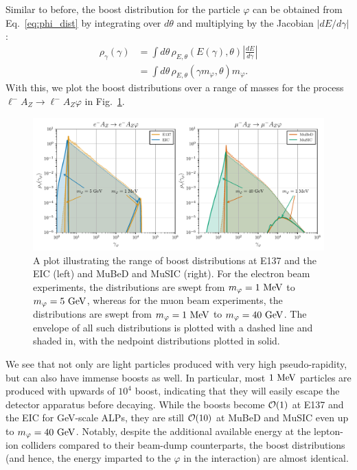 Similar to before, the boost distribution for the particle $\varphi$ can be obtained from Eq.~\ref{eq:phi_dist} by integrating over $d\theta$ and multiplying by the Jacobian $|dE/d\gamma|$:
\begin{align}
    \rho_\gamma(\gamma) &= \int{d\theta\, \rho_{E,\theta}(E(\gamma), \theta)\left|\frac{dE}{d\gamma}\right|} \nonumber\\
    &= \int{d\theta\,\rho_{E,\theta}(\gamma m_\varphi, \theta)}m_\varphi.
\end{align}
With this, we plot the boost distributions over a range of masses for the process $\ell^- A_Z \rightarrow \ell^- A_Z \varphi$ in Fig.~\ref{fig:boost_distributions_diagonal}.

\begin{figure}[t!]
    \centering
    \includegraphics[width=\linewidth]{figures/chapter4/gamma_distributions_diagonal.pdf}
    \caption[Boost distributions of scalars produced at various lepton-nucleus collision experiments.]{A plot illustrating the range of boost distributions at E137 and the EIC (left) and MuBeD and MuSIC (right). For the electron beam experiments, the distributions are swept from $m_\varphi=1~{\rm MeV}$ to $m_\varphi = 5~{\rm GeV}$, whereas for the muon beam experiments, the distributions are swept from $m_\varphi=1~{\rm MeV}$ to $m_\varphi = 40~{\rm GeV}$. The envelope of all such distributions is plotted with a dashed line and shaded in, with the nedpoint distributions plotted in solid.}
    \label{fig:boost_distributions_diagonal}
\end{figure}
We see that not only are light particles produced with very high pseudo-rapidity, but can also have immense boosts as well. In particular, most $1~{\rm MeV}$ particles are produced with upwards of $10^4$ boost, indicating that they will easily escape the detector apparatus before decaying. While the boosts become ${\cal O}(1)$ at E137 and the EIC for GeV-scale ALPs, they are still ${\cal O}(10)$ at MuBeD and MuSIC even up to $m_\varphi = 40~{\rm GeV}$. Notably, despite the additional available energy at the lepton-ion colliders compared to their beam-dump counterparts, the boost distributions (and hence, the energy imparted to the $\varphi$ in the interaction) are almost identical.

